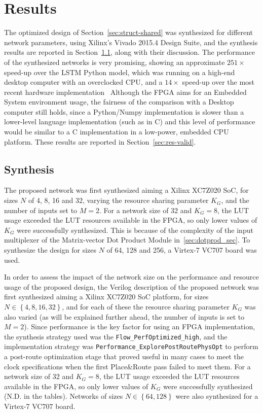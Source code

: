 \chapter{Results}\label{chap:results}
The optimized design of Section~\ref{sec:struct-shared} was synthesized for different network parameters, using Xilinx's Vivado 2015.4 Design Suite,
and the synthesis results are reported in Section~\ref{sec:res-synth}, along with their discussion. The performance of the synthesized networks is very promising,
showing an approximate $251\times$ speed-up over the LSTM Python model, which was running on a high-end desktop computer with an overclocked CPU, and a $14\times$ speed-up
over the most recent hardware implementation~\cite{Chang15} Although the FPGA aims for an Embedded System environment usage, the fairness of the comparison with a Desktop computer
still holds, since a Python/Numpy implementation is slower than a lower-level language implementation (such as in C) and this level of performance would be similar to a C implementation
in a low-power, embedded CPU platform. These results are reported in Section~\ref{sec:res-valid}.

\section{Synthesis}\label{sec:res-synth}
The proposed network was first synthesized aiming a Xilinx XC7Z020 SoC, for sizes $N$ of 4, 8, 16 and 32, varying the resource sharing parameter $K_G$, and the number of inputs set
to $M=2$. For a network size of 32 and $K_G=8$, the LUT usage exceeded the LUT resources available in the FPGA, so only lower values of $K_G$ were
successfully synthesized. This is because of the complexity of the input multiplexer of the Matrix-vector Dot Product Module in~\ref{sec:dotprod_sec}. To synthesize the
design for sizes $N$ of 64, 128 and 256, a Virtex-7 VC707 board was used.

In order to assess the impact of the network size on the performance and resource usage of the proposed design, the Verilog description of the proposed network was first synthesized
aiming a Xilinx XC7Z020 SoC platform, for sizes $N \in \left\{4, 8, 16, 32 \right\}$, and for each of these the resource sharing parameter $K_G$ was also varied (as will be explained further ahead,
the number of inputs is set to $M=2$). Since performance is the key factor for using an FPGA implementation, the synthesis strategy used was the \verb+Flow_PerfOptimized_high+, and the implementation
strategy was \verb+Performance_ExplorePostRoutePhysOpt+ to perform a post-route optimization stage that proved useful in many cases to meet the clock specifications when the first Place\&Route pass
failed to meet them. For a network size of 32 and $K_G=8$, the LUT usage exceeded the LUT resources available in the FPGA, so only lower values of $K_G$ were successfully synthesized (N.D. in the tables).
Networks of sizes $N \in \left\{64, 128\right\}$ were also synthesized for a Virtex-7 VC707 board.

